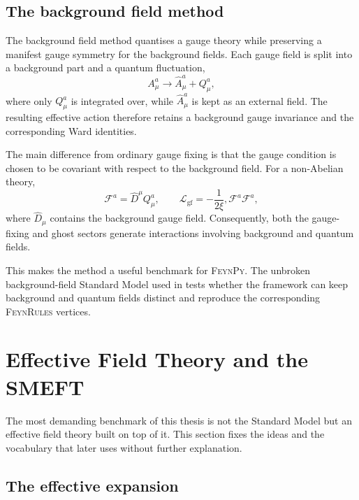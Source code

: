 \subsection{The background field method}
\label{sec:theory-bfm}

The background field method quantises a gauge theory while preserving a
manifest gauge symmetry for the background fields. Each gauge field is split
into a background part and a quantum fluctuation,
\begin{equation}
A_\mu^a \longrightarrow \widehat A_\mu^a + Q_\mu^a ,
\label{eq:theory-bfm-split}
\end{equation}
where only \(Q_\mu^a\) is integrated over, while \(\widehat A_\mu^a\) is kept
as an external field. The resulting effective action therefore retains a
background gauge invariance and the corresponding Ward identities.

The main difference from ordinary gauge fixing is that the gauge condition is
chosen to be covariant with respect to the background field. For a
non-Abelian theory,
\begin{equation}
\mathcal F^a = \widehat D^\mu Q_\mu^a,
\qquad
\mathcal L_{\mathrm{gf}}
= - \frac{1}{2\xi}, \mathcal F^a \mathcal F^a ,
\label{eq:theory-bfm-gf}
\end{equation}
where \(\widehat D_\mu\) contains the background gauge field. Consequently,
both the gauge-fixing and ghost sectors generate interactions involving
background and quantum fields.

This makes the method a useful benchmark for \textsc{FeynPy}. The unbroken
background-field Standard Model used in  tests whether the
framework can keep background and quantum fields distinct and reproduce the
corresponding \textsc{FeynRules} vertices.



\section{Effective Field Theory and the SMEFT}
\label{sec:theory-smeft}

The most demanding benchmark of this thesis is not the Standard Model but an
effective field theory built on top of it. This section fixes the ideas and
the vocabulary that  later uses without further
explanation.

\subsection{The effective expansion}

